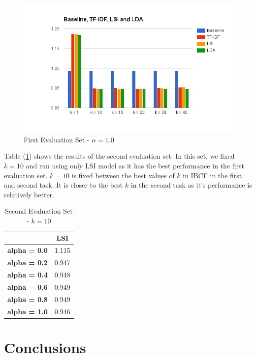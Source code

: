 \documentclass{sigish}
\begin{document}
\begin{figure}
\centering
\includegraphics[width=\columnwidth]{images/evaluations.png}
\caption{First Evaluation Set - $ \alpha = 1.0 $}
\label{fig:eval_01}
\end{figure}

Table (\ref{tab:eval_02}) shows the results of the second evaluation set. In this set, we fixed $ k = 10 $ and run using only LSI model as it has the best performance in the first evaluation set. $ k = 10 $ is fixed between the best values of $ k $ in IBCF in the first and second task. It is closer to the best $ k $ in the second task as it's performance is relatively better.

\begin{table}[]
\centering
\begin{tabular}{|c|c|}
\hline
                     & \textbf{LSI} \\ \hline
\textbf{alpha = 0.0} & 1.115        \\ \hline
\textbf{alpha = 0.2} & 0.947        \\ \hline
\textbf{alpha = 0.4} & 0.948        \\ \hline
\textbf{alpha = 0.6} & 0.949        \\ \hline
\textbf{alpha = 0.8} & 0.949        \\ \hline
\textbf{alpha = 1.0} & 0.946        \\ \hline

\end{tabular}
\caption{Second Evaluation Set - $ k = 10 $}
\label{tab:eval_02}
\end{table}

\section{Conclusions}
\end{document}
